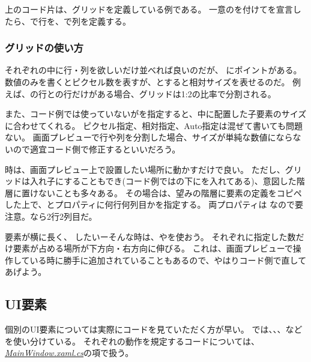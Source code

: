 \documentclass[letterpaper,10pt,dvipdfmx]{sphinxmanual}
\begin{document}
上のコード片は、グリッドを定義している例である。
一意のを付けてを宣言したら、で行を、で列を定義する。


\subsubsection{グリッドの使い方}
\label{\detokenize{nissyu-idohen/pc-software-code:}}\label{\detokenize{nissyu-idohen/pc-software-code:id8}}
それぞれの中に行・列を欲しいだけ並べれば良いのだが、 にポイントがある。
数値のみを書くとピクセル数を表すが、とすると相対サイズを表せるのだ。
例えば、の行との行だけがある場合、グリッドは1:2の比率で分割される。

また、コード例では使っていないがを指定すると、中に配置した子要素のサイズに合わせてくれる。
ピクセル指定、相対指定、Auto指定は混ぜて書いても問題ない。
画面プレビューで行や列を分割した場合、サイズが単純な数値にならないので適宜コード側で修正するといいだろう。

 時は、画面プレビュー上で設置したい場所に動かすだけで良い。
ただし、グリッドは入れ子にすることもでき(コード例ではの下にを入れてある)、意図した階層に置けないことも多々ある。
その場合は、望みの階層に要素の定義をコピペした上で、とプロパティに何行何列目かを指定する。
両プロパティは なので要注意。なら2行2列目だ。

要素が横に長く、 したいーそんな時は、やを使おう。
それぞれに指定した数だけ要素が占める場所が下方向・右方向に伸びる。
これは、画面プレビューで操作している時に勝手に追加されていることもあるので、やはりコード側で直してあげよう。


\subsection{UI要素}
\label{\detokenize{nissyu-idohen/pc-software-code:ui}}
個別のUI要素については実際にコードを見ていただく方が早い。
では、、、などを使い分けている。
それぞれの動作を規定するコードについては、{\hyperref[\detokenize{nissyu-idohen/pc-software-code:mainwindow-xaml-cs}]{\emph{MainWindow.xaml.cs}}}の項で扱う。
\end{document}
